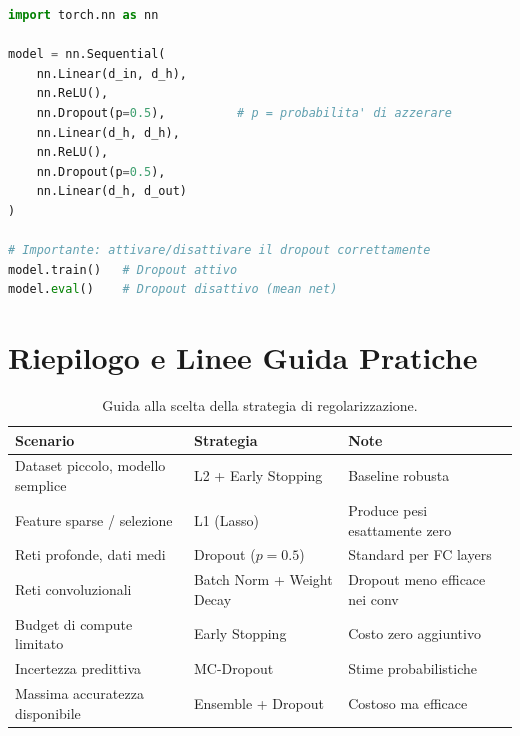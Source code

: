 \begin{lstlisting}[language=Python, caption={Dropout in PyTorch.}, label={lst:dropout-pytorch}]
import torch.nn as nn

model = nn.Sequential(
    nn.Linear(d_in, d_h),
    nn.ReLU(),
    nn.Dropout(p=0.5),          # p = probabilita' di azzerare
    nn.Linear(d_h, d_h),
    nn.ReLU(),
    nn.Dropout(p=0.5),
    nn.Linear(d_h, d_out)
)

# Importante: attivare/disattivare il dropout correttamente
model.train()   # Dropout attivo
model.eval()    # Dropout disattivo (mean net)
\end{lstlisting}

\section{Riepilogo e Linee Guida Pratiche}
\label{sec:gen-summary}

\begin{table}[H]
  \centering
  \caption{Guida alla scelta della strategia di regolarizzazione.}
  \label{tab:regularization-guide}
  \small
  \begin{tabularx}{\linewidth}{X l X}
    \toprule
    \textbf{Scenario} & \textbf{Strategia} & \textbf{Note} \\
    \midrule
    Dataset piccolo, modello semplice     & L2 + Early Stopping       & Baseline robusta \\
    Feature sparse / selezione            & L1 (Lasso)                & Produce pesi esattamente zero \\
    Reti profonde, dati medi              & Dropout ($p=0.5$)         & Standard per FC layers \\
    Reti convoluzionali                   & Batch Norm + Weight Decay & Dropout meno efficace nei conv \\
    Budget di compute limitato            & Early Stopping            & Costo zero aggiuntivo \\
    Incertezza predittiva                 & MC-Dropout                & Stime probabilistiche \\
    Massima accuratezza disponibile       & Ensemble + Dropout        & Costoso ma efficace \\
    \bottomrule
  \end{tabularx}
\end{table}

